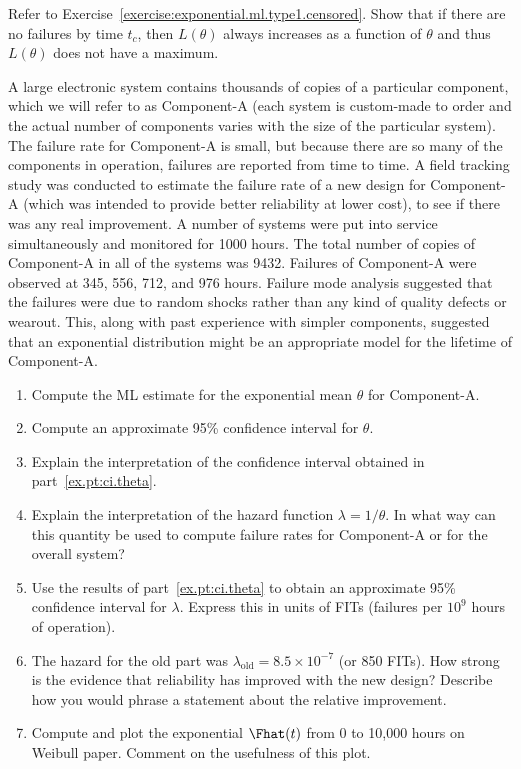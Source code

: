\begin{exercise}
Refer to Exercise~\ref{exercise:exponential.ml.type1.censored}. Show that 
if there are no failures by time
$t_{c}$, then $L(\theta)$ always increases as a function of 
$\theta$ and thus $L(\theta)$ does not have a maximum.
\end{exercise}

\begin{exercise}
\label{exercise:elec.sys}
A large electronic system contains thousands of copies of a particular
component, which we will refer to as Component-A (each system is
custom-made to order and the actual number of components varies with
the size of the particular system). The failure rate for Component-A
is small, but because there are so many of the components in
operation, failures are reported from time to time. A field tracking
study was conducted to estimate the failure rate of a new design for
Component-A (which was intended to provide better reliability at lower
cost), to see if there was any real improvement. A number of systems
were put into service simultaneously and monitored for 1000 hours. The
total number of copies of Component-A in all of the systems was 9432.
Failures of Component-A were observed at 345, 556, 712, and 976 hours.
Failure mode analysis suggested that the failures were due to random
shocks rather than any kind of quality defects or wearout. This,
along with past experience with simpler components, suggested that
an exponential distribution might be an appropriate
model for the lifetime of Component-A.
\begin{enumerate}
\item
Compute the ML estimate for the exponential mean $\theta$
for Component-A.
\item
\label{ex.pt:ci.theta}
Compute an approximate 95\% confidence interval for $\theta$.
\item
Explain the interpretation of the confidence interval
obtained in part~\ref{ex.pt:ci.theta}.
\item
Explain the interpretation of the hazard function 
$\lambda=1/\theta$. In what way can this quantity be used to compute
failure rates for Component-A or for the overall system?
\item
Use the results of part~\ref{ex.pt:ci.theta} to obtain an approximate
95\% confidence interval for $\lambda$. Express this in units of FITs
(failures per $10^{9}$ hours of operation).
\item
The hazard for the old part was $\lambda_{\mbox{old}}=8.5 \times
10^{-7}$
(or 850 FITs). How strong is the evidence that reliability has improved
with the new design? Describe how you would phrase a statement about
the relative improvement.
\item
Compute and plot the exponential $\Fhat(t)$ from 0 to 10,000
hours on Weibull paper. Comment on the usefulness of this plot.
\end{enumerate}
\end{exercise}

